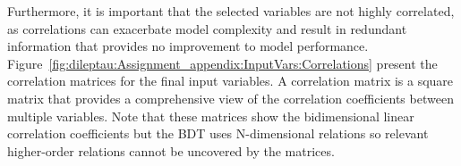 
Furthermore, it is important that the selected variables are not highly correlated, as correlations 
can exacerbate model complexity and result in redundant information that provides no improvement to model performance.
Figure~\ref{fig:dileptau:Assignment_appendix:InputVars:Correlations} present the 
correlation matrices for the final input variables. A correlation matrix is a square 
matrix that provides a comprehensive view of the correlation coefficients between 
multiple variables. Note that these matrices show the bidimensional linear correlation coefficients
but the BDT uses N-dimensional relations so relevant higher-order relations cannot be
uncovered by the matrices.

